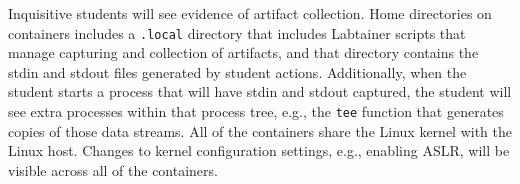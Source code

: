 \documentclass[12pt]{article}
\begin{document}
Inquisitive students will see evidence of artifact collection.  Home directories
on containers includes a \texttt{.local} directory that includes Labtainer scripts that manage
capturing and collection of artifacts, and that directory contains the stdin and
stdout files generated by student actions. Additionally, when the student starts a process
that will have stdin and stdout captured, the student will see extra processes within
that process tree, e.g., the \texttt{tee} function that generates copies of those data streams.
All of the containers share the Linux kernel with the Linux host.  Changes to
kernel configuration settings, e.g., enabling ASLR, will be visible across all
of the containers.
\end{document}
